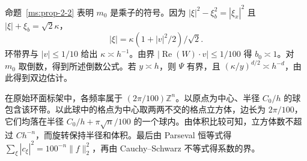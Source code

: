 命题~\ref{ms:prop-2-2} 表明 $m_0$ 是乘子的符号。因为 $|\xi|^2-\xi_b^2=|\xi_x|^2$ 且 $|\xi|+\xi_b=\sqrt2\kappa$，
\[
 |\xi|=\kappa(1+|v|^2/2)/\sqrt2 .
\]
环带界与 $|v|\le1/10$ 给出 $\kappa\asymp h^{-1}$。由界 $|\operatorname{Re}(W)\cdot v|\le1/100$ 得 $b_0\asymp1$。对 $m_0$ 取倒数，得到所述倒数公式。若 $y\asymp h$，则 $\Psi$ 有界，且 $(\kappa/y)^{d/2}\asymp h^{-d}$，由此得到双边估计。

在原始环面标架中，各频率属于 $(2\pi/100)\mathbb Z^n$。以原点为中心、半径 $C_0/h$ 的球包含该环带。以此球中的格点为中心取两两不交的格点立方体，边长为 $2\pi/100$，它们均落在半径 $C_0/h+\pi\sqrt n/100$ 的一个球内。由体积比较可知，立方体数不超过 $Ch^{-n}$，而旋转保持半径和体积。最后由 Parseval 恒等式得 $\sum_\xi|c_\xi|^2=100^{-n}\|f\|_2^2$，再由 Cauchy--Schwarz 不等式得系数的界。
